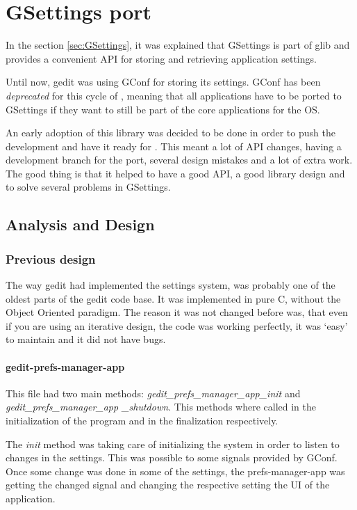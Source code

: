 
\chapter{GSettings port}

In the section \ref{sec:GSettings}, it was explained that GSettings is part of glib and provides a convenient API for storing and retrieving application settings.

Until now, gedit was using GConf for storing its settings. GConf has been \emph{deprecated} for this cycle of \GNOME, meaning that all \GNOME applications have to be ported to GSettings if they want to still be part of the core applications for the \GNOME OS.

An early adoption of this library was decided to be done in order to push the development and have it ready for . This meant a lot of API changes, having a development branch for the port, several design mistakes and a lot of extra work. The good thing is that it helped to have a good API, a good library design and to solve several problems in GSettings.

\section{Analysis and Design}

\subsection{Previous design}

The way gedit had implemented the settings system, was probably one of the oldest parts of the gedit code base. It was implemented in pure C, without the Object Oriented paradigm. The reason it was not changed before was, that even if you are using an iterative design, the code was working perfectly, it was `easy' to maintain and it did not have bugs.

\newpage
\subsubsection*{gedit-prefs-manager-app}

This file had two main methods: \textit{gedit\_prefs\_manager\_app\_init} and \textit{gedit\_prefs\_manager\_app \_shutdown}. This methods where called in the initialization of the program and in the finalization respectively.

The \emph{init} method was taking care of initializing the system in order to listen to changes in the settings. This was possible to some signals provided by GConf. Once some change was done in some of the settings, the prefs-manager-app was getting the changed signal and changing the respective setting the UI of the application.

